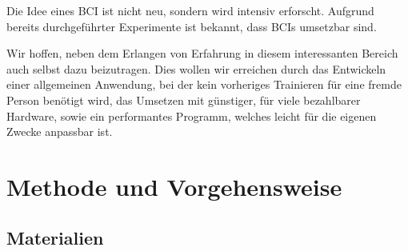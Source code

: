 \documentclass{scrartcl}
\begin{document}
	Die Idee eines BCI ist nicht neu, sondern wird intensiv erforscht. Aufgrund bereits durchgeführter Experimente ist bekannt, dass BCIs umsetzbar sind. \cite{BCIChaudhary}
	
	Wir hoffen, neben dem Erlangen von Erfahrung in diesem interessanten Bereich auch selbst dazu beizutragen. Dies wollen wir erreichen durch das Entwickeln einer allgemeinen Anwendung, bei der kein vorheriges Trainieren für eine fremde Person benötigt wird, das Umsetzen mit günstiger, für viele bezahlbarer Hardware, sowie ein performantes Programm, welches leicht für die eigenen Zwecke anpassbar ist.
	
	\section{Methode und Vorgehensweise}

	\subsection{Materialien} \label{Materialien}
\end{document}
